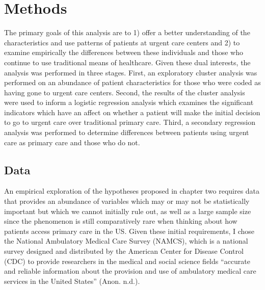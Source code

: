 \documentclass[12pt,twoside]{reedthesis}
\begin{document}
  \chapter*{Methods}\label{methods}
  
  \setcounter{chapter}{4} \setcounter{section}{0} \doublespacing
  
  The primary goals of this analysis are to 1) offer a better
  understanding of the characteristics and use patterns of patients at
  urgent care centers and 2) to examine empirically the differences
  between these individuals and those who continue to use traditional
  means of healthcare. Given these dual interests, the analysis was
  performed in three stages. First, an exploratory cluster analysis was
  performed on an abundance of patient characteristics for those who were
  coded as having gone to urgent care centers. Second, the results of the
  cluster analysis were used to inform a logistic regression analysis
  which examines the significant indicators which have an affect on
  whether a patient will make the initial decision to go to urgent care
  over traditional primary care. Third, a secondary regression analysis
  was performed to determine differences between patients using urgent
  care as primary care and those who do not.
  
  \section*{Data}\label{data}
  
  An empirical exploration of the hypotheses proposed in chapter two
  requires data that provides an abundance of variables which may or may
  not be statistically important but which we cannot initially rule out,
  as well as a large sample size since the phenomenon is still
  comparatively rare when thinking about how patients access primary care
  in the US. Given these initial requirements, I chose the National
  Ambulatory Medical Care Survey (NAMCS), which is a national survey
  designed and distributed by the American Center for Disease Control
  (CDC) to provide researchers in the medical and social science fields
  ``accurate and reliable information about the provision and use of
  ambulatory medical care services in the United States'' (Anon. n.d.).
  
\end{document}
